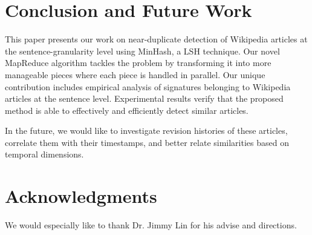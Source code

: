 \documentclass{acm_proc_article-sp}
\begin{document}
\section{Conclusion and Future Work}
This paper presents our work on near-duplicate detection of Wikipedia articles at the sentence-granularity level using MinHash, a LSH technique. Our novel MapReduce algorithm tackles the problem by transforming it into more manageable pieces where each piece is handled in parallel. Our unique contribution includes empirical analysis of signatures belonging to Wikipedia articles at the sentence level. Experimental results verify that the proposed method is able to effectively and efficiently detect similar articles.

In the future, we would like to investigate revision histories of these articles, correlate them with their timestamps, and better relate similarities based on temporal dimensions. 

\section{Acknowledgments}
We would especially like to thank Dr. Jimmy Lin for his advise and directions.



\balancecolumns
\end{document}
